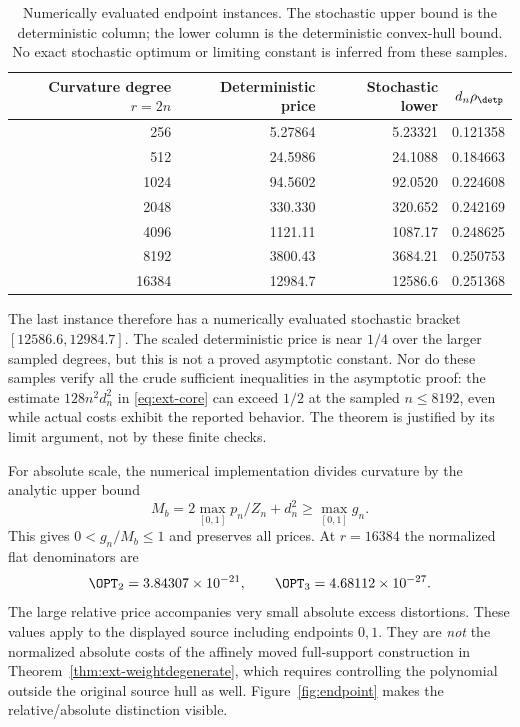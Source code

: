 \begin{table}[ht]
\centering\small
\begin{tabular}{@{}rrrr@{}}
\toprule
Curvature degree $r=2n$ & Deterministic price & Stochastic lower & $d_n\rho_{\detp}$ \\
\midrule
256 & 5.27864 & 5.23321 & 0.121358 \\
512 & 24.5986 & 24.1088 & 0.184663 \\
1024 & 94.5602 & 92.0520 & 0.224608 \\
2048 & 330.330 & 320.652 & 0.242169 \\
4096 & 1121.11 & 1087.17 & 0.248625 \\
8192 & 3800.43 & 3684.21 & 0.250753 \\
16384 & 12984.7 & 12586.6 & 0.251368 \\
\bottomrule
\end{tabular}
\caption{Numerically evaluated endpoint instances. The stochastic upper
bound is the deterministic column; the lower column is the deterministic
convex-hull bound. No exact stochastic optimum or limiting constant is
inferred from these samples.}
\label{tab:endpointnumerics}
\end{table}

The last instance therefore has a numerically evaluated stochastic bracket
$[12586.6,12984.7]$. The scaled deterministic price is near $1/4$ over the
larger sampled degrees, but this is not a proved asymptotic constant. Nor
do these samples verify all the crude sufficient inequalities in the
asymptotic proof: the estimate $128n^2d_n^2$ in
\eqref{eq:ext-core} can exceed $1/2$ at the sampled $n\le8192$, even while
actual costs exhibit the reported behavior. The theorem is justified by its
limit argument, not by these finite checks.

For absolute scale, the numerical implementation divides curvature by the
analytic upper bound
\[
M_b=2\max_{[0,1]}p_n/Z_n+d_n^2\ge\max_{[0,1]}g_n.
\]
This gives $0<g_n/M_b\le1$ and preserves all prices. At $r=16384$ the
normalized flat denominators are
\[
\OPT_2=3.84307\times10^{-21},\qquad
\OPT_3=4.68112\times10^{-27}.
\]
The large relative price accompanies very small absolute excess distortions.
These values apply to the displayed source including endpoints $0,1$.
They are \emph{not} the normalized absolute costs of the affinely moved
full-support construction in Theorem~\ref{thm:ext-weightdegenerate}, which
requires controlling the polynomial outside the original source hull as
well. Figure~\ref{fig:endpoint} makes the relative/absolute distinction
visible.

